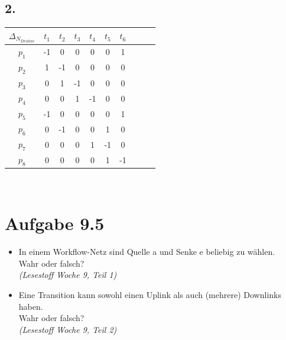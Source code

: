 \documentclass[12pt, paper=a4]{article}
\begin{document}
\subsection*{2.}
\begin{tabular}{ | c | c c c c c c | c | c | c |}
	\hline
	$\Delta_{N_{Drohne}}$ & $t_1$ & $t_2$ & $t_3$ & $t_4$ & $t_5$ & $t_6$\\
	\hline
	$p_1$ & -1 & 0 & 0 & 0 & 0 & 1\\
	$p_2$ & 1 & -1 & 0 & 0 & 0 & 0\\
	$p_3$ & 0 & 1 & -1 & 0 & 0 & 0\\
	$p_4$ & 0 & 0 & 1 & -1 & 0 & 0\\
	$p_5$ & -1 & 0 & 0 & 0 & 0 & 1\\
	$p_6$ & 0 & -1 & 0 & 0 & 1 & 0\\
	$p_7$ & 0 & 0 & 0 & 1 & -1 & 0\\
	$p_8$ & 0 & 0 & 0 & 0 & 1 & -1\\
	\hline
\end{tabular}
\\

\section*{Aufgabe 9.5}
	\begin{itemize}
	\item In einem Workflow-Netz sind Quelle a und Senke e beliebig zu w\"ahlen.\\
		Wahr oder falsch?\\
		\textit{(Lesestoff Woche 9, Teil 1)}
	\item Eine Transition kann sowohl einen Uplink als auch (mehrere) Downlinks haben.\\
		Wahr oder falsch?\\
		\textit{(Lesestoff Woche 9, Teil 2)}
	\end{itemize}
\end{document}
